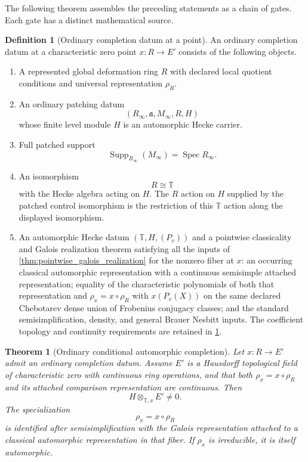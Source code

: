 \documentclass[11pt]{amsart}
\newtheorem{theorem}{Theorem}[section]
\theoremstyle{definition}
\newtheorem{definition}[definition]{Definition}
\theoremstyle{remark}
\newcommand{\TT}{\mathbb T}
\newcommand{\Spec}{\operatorname{Spec}}
\newcommand{\Supp}{\operatorname{Supp}}
\newcommand{\fraka}{\mathfrak a}
\begin{document}
The following theorem assembles the preceding statements as a chain of gates. Each gate has a distinct mathematical source.

\begin{definition}[Ordinary completion datum at a point]\label{def:ordinary_completion_datum}
An ordinary completion datum at a characteristic zero point \(x:R\to E'\) consists of the following objects.
\begin{enumerate}
\item A represented global deformation ring \(R\) with declared local quotient conditions and universal representation \(\rho_R\).
\item An ordinary patching datum
\[
(R_\infty,\fraka,M_\infty,R,H)
\]
whose finite level module \(H\) is an automorphic Hecke carrier.
\item Full patched support
\[
\Supp_{R_\infty}(M_\infty)=\Spec R_\infty.
\]
\item An isomorphism
\[
R\cong\TT
\]
with the Hecke algebra acting on \(H\). The \(R\) action on \(H\) supplied by the patched control isomorphism is the restriction of this \(\TT\) action along the displayed isomorphism.
\item An automorphic Hecke datum \((\TT,H,(P_v))\) and a pointwise classicality and Galois realization theorem satisfying all the inputs of \cref{thm:pointwise_galois_realization} for the nonzero fiber at \(x\): an occurring classical automorphic representation with a continuous semisimple attached representation; equality of the characteristic polynomials of both that representation and \(\rho_x=x\circ\rho_R\) with \(x(P_v(X))\) on the same declared Chebotarev dense union of Frobenius conjugacy classes; and the standard semisimplification, density, and general Brauer Nesbitt inputs. The coefficient topology and continuity requirements are retained in \cref{thm:ordinary_conditional_completion}.
\end{enumerate}
\end{definition}

\begin{theorem}[Ordinary conditional automorphic completion]\label{thm:ordinary_conditional_completion}
Let \(x:R\to E'\) admit an ordinary completion datum. Assume \(E'\) is a Hausdorff topological field of characteristic zero with continuous ring operations, and that both \(\rho_x=x\circ\rho_R\) and its attached comparison representation are continuous. Then
\[
\boxed{
H\otimes_{\TT,x}E'\neq0.
}
\]
The specialization
\[
\rho_x=x\circ\rho_R
\]
is identified after semisimplification with the Galois representation attached to a classical automorphic representation in that fiber. If \(\rho_x\) is irreducible, it is itself automorphic.
\end{theorem}
\end{document}
